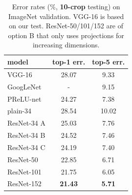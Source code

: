 \documentclass[10pt,twocolumn,letterpaper]{article}
\begin{document}
\begin{table}[t]
  \setlength{\tabcolsep}{8pt}
  \begin{center}
    \small
    \begin{tabular}{l|cc}
      \hline
      \footnotesize model                        & \footnotesize top-1 err. & \footnotesize top-5 err. \\
      \hline
      \footnotesize VGG-16 \cite{Simonyan2015}   & 28.07                    & 9.33                     \\
      \footnotesize GoogLeNet \cite{Szegedy2015} & -                        & 9.15                     \\
      \footnotesize PReLU-net \cite{He2015}      & 24.27                    & 7.38                     \\
      \hline
      \hline
      \footnotesize plain-34                     & 28.54                    & 10.02                    \\
      \footnotesize ResNet-34 A                  & 25.03                    & 7.76                     \\
      \footnotesize ResNet-34 B                  & 24.52                    & 7.46                     \\
      \footnotesize ResNet-34 C                  & 24.19                    & 7.40                     \\
      \hline
      \footnotesize ResNet-50                    & 22.85                    & 6.71                     \\
      \footnotesize ResNet-101                   & 21.75                    & 6.05                     \\
      \footnotesize ResNet-152                   & \textbf{21.43}           & \textbf{5.71}            \\
      \hline
    \end{tabular}
  \end{center}
  \vspace{-.5em}
  \caption{Error rates (\%, \textbf{10-crop} testing) on ImageNet validation.
    VGG-16 is based on our test. ResNet-50/101/152 are of option B that only uses projections for increasing dimensions.}
  \label{tab:10crop}
  \vspace{-.5em}
\end{table}
\end{document}
